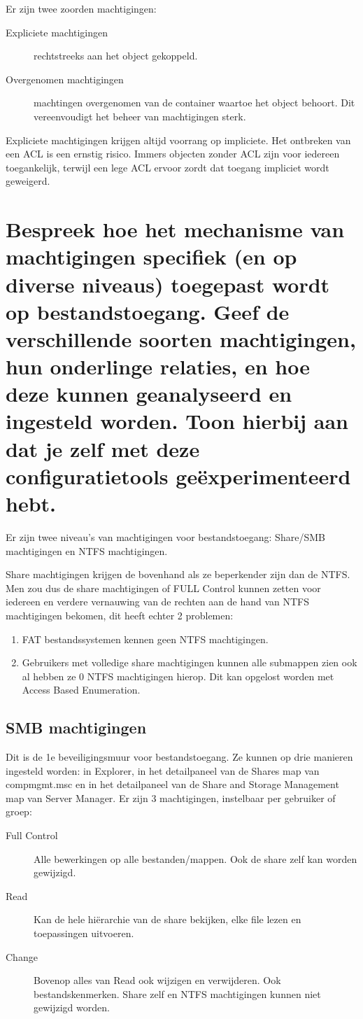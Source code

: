 Er zijn twee zoorden machtigingen:
\begin{description}
	\item[Expliciete machtigingen] rechtstreeks aan het object gekoppeld.
	\item[Overgenomen machtigingen] machtingen overgenomen van de container
		waartoe het object behoort. Dit vereenvoudigt het beheer van
		machtigingen sterk.
\end{description}

Expliciete machtigingen krijgen altijd voorrang op impliciete. Het ontbreken van
een ACL is een ernstig risico. Immers objecten zonder ACL zijn voor iedereen
toegankelijk, terwijl een lege ACL ervoor zordt dat toegang impliciet wordt
geweigerd.

\section{Bespreek hoe het mechanisme van machtigingen specifiek (en op diverse
niveaus) toegepast wordt op bestandstoegang. Geef de verschillende soorten
machtigingen, hun onderlinge relaties, en hoe deze kunnen geanalyseerd en
ingesteld worden. Toon hierbij aan dat je zelf met deze configuratietools
geëxperimenteerd hebt.}

Er zijn twee niveau's van machtigingen voor bestandstoegang: Share/SMB
machtigingen en NTFS machtigingen.

Share machtigingen krijgen de bovenhand als ze beperkender zijn dan de NTFS. Men
zou dus de share machtigingen of FULL Control kunnen zetten voor iedereen en
verdere vernauwing van de rechten aan de hand van NTFS machtigingen bekomen, dit
heeft echter 2 problemen:
\begin{enumerate}
	\item FAT bestandssystemen kennen geen NTFS machtigingen.
	\item Gebruikers met volledige share machtigingen kunnen alle submappen
		zien ook al hebben ze 0 NTFS machtigingen hierop. Dit kan
		opgelost worden met Access Based Enumeration.
\end{enumerate}

\subsection{SMB machtigingen}

Dit is de 1e beveiligingsmuur voor bestandstoegang. Ze kunnen op drie manieren
ingesteld worden: in Explorer, in het detailpaneel van de Shares map van
compmgmt.msc en in het detailpaneel van de Share and Storage Management map van
Server Manager. Er zijn 3 machtigingen, instelbaar per gebruiker of groep:
\begin{description}
	\item[Full Control] Alle bewerkingen op alle bestanden/mappen. Ook de
		share zelf kan worden gewijzigd.
	\item[Read] Kan de hele hiërarchie van de share bekijken, elke file
		lezen en toepassingen uitvoeren.
	\item[Change] Bovenop alles van Read ook wijzigen en verwijderen. Ook
		bestandskenmerken. Share zelf en NTFS machtigingen kunnen niet
		gewijzigd worden.
\end{description}

